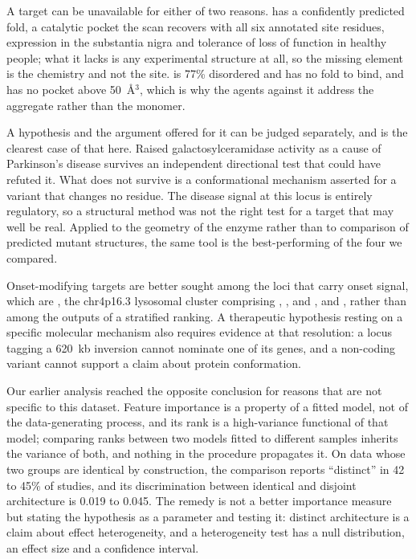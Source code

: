 \documentclass[10pt]{article}
\begin{document}
A target can be unavailable for either of two reasons.  has
a confidently predicted fold, a catalytic pocket the scan recovers with all six annotated site
residues, expression in the substantia nigra and tolerance of loss of function in healthy people;
what it lacks is any experimental structure at all, so the missing element is the chemistry and not the site.  is 77\% disordered and has no fold to bind, and  has no pocket above 50~\AA$^3$, which is why the agents against it address
the aggregate rather than the monomer.

A hypothesis and the argument offered for it can be judged separately, and  is the clearest case of that here. Raised galactosylceramidase activity as a cause of Parkinson's disease survives an independent directional test that could have refuted it. What does not survive is a conformational mechanism asserted for a variant that changes no residue. The disease signal at this locus is entirely regulatory, so a structural method was not the right test for a target that may well be real.
Applied to the geometry of the enzyme rather than to comparison of predicted mutant structures,
the same tool is the best-performing of the four we compared.

Onset-modifying targets are better sought among the loci that carry onset signal, which are , the chr4p16.3 lysosomal cluster comprising , ,
 and , and , rather than among the outputs of a stratified
ranking. A therapeutic hypothesis resting on a specific molecular mechanism also requires evidence
at that resolution: a locus tagging a 620~kb inversion cannot nominate one of its genes, and a
non-coding variant cannot support a claim about protein conformation.

Our earlier analysis reached the opposite conclusion for reasons that are not specific to this dataset. Feature importance is a property of a fitted model, not of the data-generating process, and its
rank is a high-variance functional of that model; comparing ranks between two models fitted to
different samples inherits the variance of both, and nothing in the procedure propagates it. On
data whose two groups are identical by construction, the comparison reports ``distinct'' in 42 to
45\% of studies, and its discrimination between identical and disjoint architecture is 0.019 to
0.045. The remedy is not a better importance measure but stating the hypothesis as a parameter and
testing it: distinct architecture is a claim about effect heterogeneity, and a heterogeneity test
has a null distribution, an effect size and a confidence interval.
\end{document}
